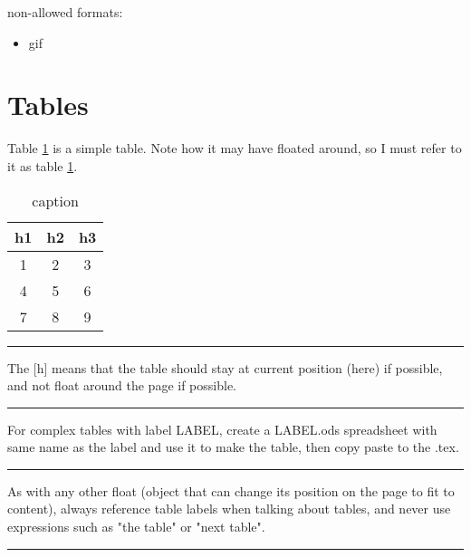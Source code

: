 \documentclass[12pt]{article}
\newcommand{\inOut}[1]{#1}                                %
\begin{document}
    non-allowed formats:

    \begin{itemize}
        \item gif
    \end{itemize}

\section{Tables}\label{secTab}

    \begin{example} \label{expTab1}
        Table \ref{tab1} is a simple table. Note how it may have floated around, so I must refer to it as table \ref{tab1}.
        \inOut{
            \begin{table}[h]
                \centering
                \begin{tabular}{ccc}
                    h1 & h2 & h3 \\
                    \hline
                    1 & 2 & 3 \\
                    4 & 5 & 6 \\
                    7 & 8 & 9 \\
                \end{tabular}
                \caption{caption}
                \label{tab1}
            \end{table}
        }
    \end{example}\hrule

    \begin{remark} \label{remTab1}
        The [h] means that the table should stay at current position (here) if possible, and not float around the page if possible.
    \end{remark}\hrule

    \begin{remark} \label{remTab2}
        For complex tables with label LABEL, create a LABEL.ods spreadsheet with same name as the label and use it to make the table, then copy paste to the .tex.
    \end{remark}\hrule

    \begin{remark} \label{remTab3}
        As with any other float (object that can change its position on the page to fit to content), always reference table labels when talking about tables, and never use expressions such as "the table" or "next table".
    \end{remark}\hrule
\end{document}
